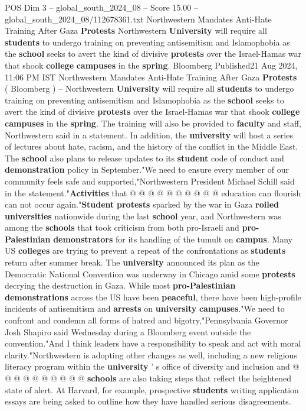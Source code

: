 \begin{textsample}{POS Dim 3 – global\_south\_2024\_08 – Score 15.00 – global\_south\_2024\_08/112678361.txt}  \label{ex:f3_pos_306}
Northwestern Mandates Anti-Hate Training After Gaza \textbf{Protests} Northwestern \textbf{University} will require all \textbf{students} to undergo training on preventing antisemitism and Islamophobia as the \textbf{school} seeks to avert the kind of divisive \textbf{protests} over the Israel-Hamas war that shook \textbf{college} \textbf{campuses} in the \textbf{spring}.
Bloomberg Published21 Aug 2024, 11:06 PM IST Northwestern Mandates Anti-Hate Training After Gaza \textbf{Protests} ( Bloomberg ) -- Northwestern \textbf{University} will require all \textbf{students} to undergo training on preventing antisemitism and Islamophobia as the \textbf{school} seeks to avert the kind of divisive \textbf{protests} over the Israel-Hamas war that shook \textbf{college} \textbf{campuses} in the \textbf{spring}.
The training will also be provided to \textbf{faculty} and staff, Northwestern said in a statement.
In addition, the \textbf{university} will host a series of lectures about hate, racism, and the history of the conflict in the Middle East.
The \textbf{school} also plans to release updates to its \textbf{student} code of conduct and \textbf{demonstration} policy in September."We need to ensure every member of our community feels safe and supported,"Northwestern President Michael Schill said in the statement."\textbf{Activities} that @ @ @ @ @ @ @ @ @ @ education can flourish can not occur again."\textbf{Student} \textbf{protests} sparked by the war in Gaza \textbf{roiled} \textbf{universities} nationwide during the last \textbf{school} year, and Northwestern was among the \textbf{schools} that took criticism from both pro-Israeli and \textbf{pro-Palestinian} \textbf{demonstrators} for its handling of the tumult on \textbf{campus}.
Many US \textbf{colleges} are trying to prevent a repeat of the confrontations as \textbf{students} return after summer break.
The \textbf{university} announced its plan as the Democratic National Convention was underway in Chicago amid some \textbf{protests} decrying the destruction in Gaza.
While most \textbf{pro-Palestinian} \textbf{demonstrations} across the US have been \textbf{peaceful}, there have been high-profile incidents of antisemitism and \textbf{arrests} on \textbf{university} \textbf{campuses}."We need to confront and condemn all forms of hatred and bigotry,"Pennsylvania Governor Josh Shapiro said Wednesday during a Bloomberg event outside the convention."And I think leaders have a responsibility to speak and act with moral clarity."Northwestern is adopting other changes as well, including a new religious literacy program within the \textbf{university} ' s office of diversity and inclusion and @ @ @ @ @ @ @ @ @ @ \textbf{schools} are also taking steps that reflect the heightened state of alert.
At Harvard, for example, prospective \textbf{students} writing application essays are being asked to outline how they have handled serious disagreements.

\end{textsample}
